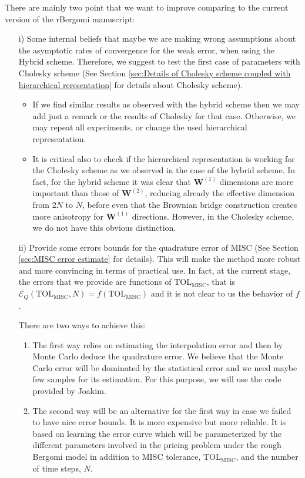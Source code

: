 There are mainly two point that we want to improve comparing to the current version of the rBergomi manuscript:

\begin{itemize}
\item[i)]  Some internal beliefs that maybe we are making wrong assumptions about the asymptotic rates of convergence for the weak error, when using the Hybrid scheme. Therefore, we suggest to test the first case of parameters with Cholesky scheme (See Section \ref{sec:Details of Cholesky scheme coupled with hierarchical reresentation} for details about Cholesky scheme). 

\begin{itemize}
\item If we find similar results as observed with the hybrid scheme then we may add just a remark or the results of Cholesky for that case. Otherwise, we may repeat all experiments, or change the used hierarchical representation. 
\item It is critical also to check if the hierarchical representation is working for the Cholesky scheme as we observed in the case of the hybrid scheme. In fact, for the hybrid scheme it was clear that $\mathbf{W}^{(1)}$ dimensions are more important than those of $\mathbf{W}^{(2)}$, reducing already  the effective dimension from $2N$ to $N$, before even that the Brownian bridge construction creates more anisotropy for  $\mathbf{W}^{(1)}$ directions. However, in the Cholesky scheme, we do not have this obvious distinction.
\end{itemize}
\item[ii)]Provide some errors bounds for the quadrature error of MISC (See Section \ref{sec:MISC error estimate} for details). This will make the method more robust and more convincing in terms of practical use. In fact, at the current stage, the errors that we provide are functions of $\text{TOL}_{\text{MISC}}$, that is $ \mathcal{E}_Q(\text{TOL}_{\text{MISC}},N)=f(\text{TOL}_{\text{MISC}})$ and it is not clear to us the behavior of $f$.

There are two ways to achieve this:

\begin{enumerate}
\item The first way relies on estimating the interpolation error and then by Monte Carlo deduce the quadrature error. We believe that the Monte Carlo error will be dominated by the statistical error and we need maybe few samples for its estimation. For this purpose, we will use the code provided by Joakim.  

\item The second way will be an alternative for the first way in case we failed to have nice error bounds. It is more expensive but more reliable. It is based on learning the error curve which will be parameterized by the different parameters involved in the pricing problem under the rough Bergomi model in addition to MISC tolerance, $\text{TOL}_{\text{MISC}}$, and the number of time steps, $N$.
\end{enumerate}




\end{itemize}